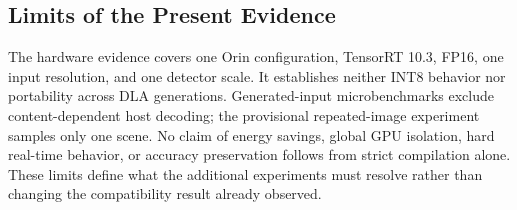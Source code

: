 \subsection{Limits of the Present Evidence}
The hardware evidence covers one Orin configuration, TensorRT 10.3, FP16, one
input resolution, and one detector scale. It establishes neither INT8 behavior
nor portability across DLA generations. Generated-input microbenchmarks exclude
content-dependent host decoding; the provisional repeated-image experiment
samples only one scene. No claim of energy savings, global GPU isolation,
hard real-time behavior, or accuracy preservation follows from strict
compilation alone. These limits define what the additional experiments must
resolve rather than changing the compatibility result already observed.
